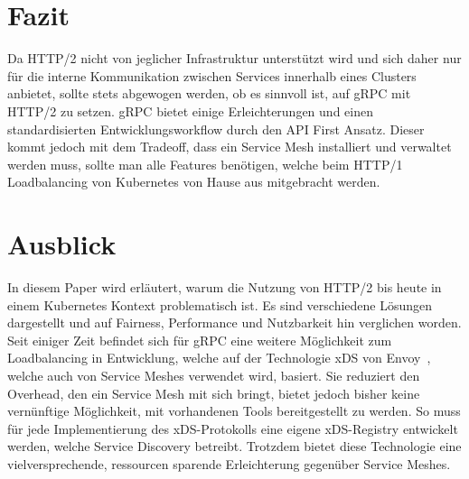 \documentclass[a4paper,12pt]{article}
\begin{document}
    \section{Fazit}\label{sec:fazit}

    Da HTTP/2 nicht von jeglicher Infrastruktur unterstützt wird und sich daher nur für die interne Kommunikation zwischen Services innerhalb eines Clusters anbietet, sollte stets abgewogen werden, ob es sinnvoll ist, auf gRPC mit HTTP/2 zu setzen.
    gRPC bietet einige Erleichterungen und einen standardisierten Entwicklungsworkflow durch den API First Ansatz.
    Dieser kommt jedoch mit dem Tradeoff, dass ein Service Mesh installiert und verwaltet werden muss, sollte man alle Features benötigen, welche beim HTTP/1 Loadbalancing von Kubernetes von Hause aus mitgebracht werden.

    \newpage

    \section{Ausblick}\label{sec:ausblick}

    In diesem Paper wird erläutert, warum die Nutzung von HTTP/2 bis heute in einem Kubernetes Kontext problematisch ist.
    Es sind verschiedene Lösungen dargestellt und auf Fairness, Performance und Nutzbarkeit hin verglichen worden.
    Seit einiger Zeit befindet sich für gRPC eine weitere Möglichkeit zum Loadbalancing in Entwicklung, welche auf der Technologie xDS von Envoy~\cite{xds}, welche auch von Service Meshes verwendet wird, basiert.
    Sie reduziert den Overhead, den ein Service Mesh mit sich bringt, bietet jedoch bisher keine vernünftige Möglichkeit, mit vorhandenen Tools bereitgestellt zu werden.
    So muss für jede Implementierung des xDS-Protokolls eine eigene xDS-Registry entwickelt werden, welche Service Discovery betreibt.
    Trotzdem bietet diese Technologie eine vielversprechende, ressourcen sparende Erleichterung gegenüber Service Meshes.

    \appendix

    \newpage

    
    
\end{document}
